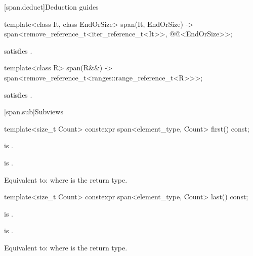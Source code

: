 [span.deduct]{Deduction guides}

%
\begin{itemdecl}
template<class It, class EndOrSize>
  span(It, EndOrSize) -> span<remove_reference_t<iter_reference_t<It>>,
                              @@<EndOrSize>>;
\end{itemdecl}

\begin{itemdescr}
\pnum
\constraints
{} satisfies .
\end{itemdescr}

%
\begin{itemdecl}
template<class R>
  span(R&&) -> span<remove_reference_t<ranges::range_reference_t<R>>>;
\end{itemdecl}

\begin{itemdescr}
\pnum
\constraints
{} satisfies .
\end{itemdescr}

[span.sub]{Subviews}

%
\begin{itemdecl}
template<size_t Count> constexpr span<element_type, Count> first() const;
\end{itemdecl}

\begin{itemdescr}
\pnum
\mandates
{} is .

\pnum
\hardexpects
{} is .

\pnum
\effects
Equivalent to: 
where  is the return type.
\end{itemdescr}

%
\begin{itemdecl}
template<size_t Count> constexpr span<element_type, Count> last() const;
\end{itemdecl}

\begin{itemdescr}
\pnum
\mandates
{} is .

\pnum
\hardexpects
{} is .

\pnum
\effects
Equivalent to: 
where  is the return type.
\end{itemdescr}

